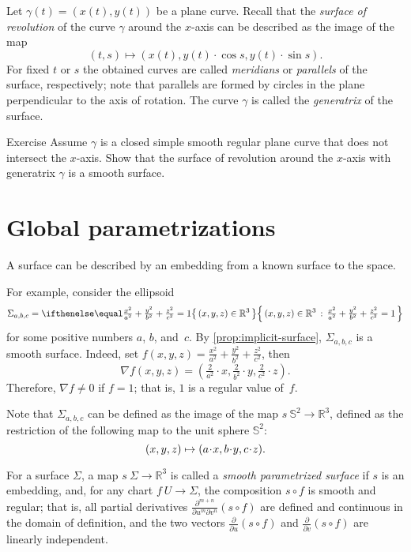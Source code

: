Let $\gamma(t)=(x(t),y(t))$ be a plane curve.
Recall that the \emph{surface of revolution} of the curve $\gamma$ around the $x$-axis can be described as the 
image of the map 
\[(t, s)\mapsto (x(t), y(t)\cdot\cos s,y(t)\cdot\sin s).\]
For fixed $t$ or $s$ the obtained curves are called \emph{meridians} or \emph{parallels} of the surface, respectively; note that parallels are formed by circles in the plane perpendicular to the axis of rotation.
The curve $\gamma$ is called the \emph{generatrix} of the surface.

\begin{thm}{Exercise}\label{ex:revolution}
Assume $\gamma$ is a closed simple smooth regular plane curve that does not intersect the $x$-axis.
Show that the surface of revolution around the $x$-axis with generatrix $\gamma$ is a smooth surface.
\end{thm}


\section{Global parametrizations}

A surface can be described by an embedding from a known surface to the space.

For example, consider the ellipsoid
\[\Sigma_{a,b,c}=\set{(x,y,z)\in\mathbb{R}^3}{\tfrac{x^2}{a^2}+\tfrac{y^2}{b^2}+\tfrac{z^2}{c^2}=1}\]
for some positive numbers $a$, $b$, and~$c$.
By \ref{prop:implicit-surface}, $\Sigma_{a,b,c}$ is a smooth surface.
Indeed, set $f(x,y,z)=\tfrac{x^2}{a^2}+\tfrac{y^2}{b^2}+\tfrac{z^2}{c^2}$,
then
\[\nabla f(x,y,z)=(\tfrac{2}{a^2}\cdot x,\tfrac{2}{b^2}\cdot y,\tfrac{2}{c^2}\cdot z).\]
Therefore, $\nabla f\ne0$ if $f=1$; that is, $1$ is a regular value of~$f$.

Note that $\Sigma_{a,b,c}$ can be defined as the image of the map $s\:\mathbb{S}^2\to\mathbb{R}^3$, defined as the restriction of the following map to the unit sphere $\mathbb{S}^2$:
\[(x,y,z)\z\mapsto (a\cdot x, b\cdot y,c\cdot z).\]

For a surface $\Sigma$, a map $s\: \Sigma \to \mathbb{R}^3$ is called a 
\emph{smooth parametrized surface} if $s$ is an embedding, and, for any chart $f\:U\to \Sigma$,
the composition $s\circ f$ is smooth and regular;
that is, all partial derivatives $\frac{\partial^{m+n}}{\partial u^m\partial v^n}(s\circ f)$ are defined and continuous in the domain of definition, and the two vectors 
$\frac{\partial}{\partial u}(s\circ f)$ and $\frac{\partial}{\partial v}(s\circ f)$ are linearly independent.

